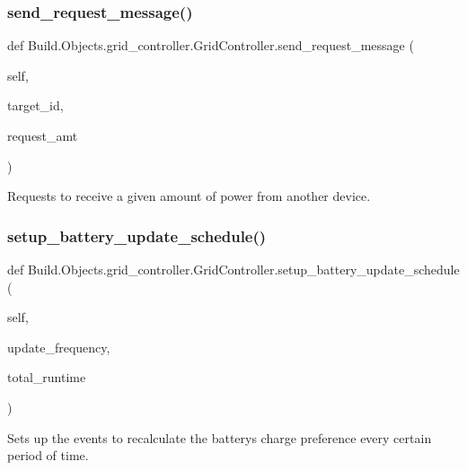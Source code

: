 \subsubsection{\texorpdfstring{send\+\_\+request\+\_\+message()}{send\_request\_message()}}
{\footnotesize\ttfamily def Build.\+Objects.\+grid\+\_\+controller.\+Grid\+Controller.\+send\+\_\+request\+\_\+message (\begin{DoxyParamCaption}\item[{}]{self,  }\item[{}]{target\+\_\+id,  }\item[{}]{request\+\_\+amt }\end{DoxyParamCaption})}



Requests to receive a given amount of power from another device. 

\mbox{\label{class_build_1_1_objects_1_1grid__controller_1_1_grid_controller_a03876bc3ddc4c92dfa5e80e74978169a}} 
\subsubsection{\texorpdfstring{setup\+\_\+battery\+\_\+update\+\_\+schedule()}{setup\_battery\_update\_schedule()}}
{\footnotesize\ttfamily def Build.\+Objects.\+grid\+\_\+controller.\+Grid\+Controller.\+setup\+\_\+battery\+\_\+update\+\_\+schedule (\begin{DoxyParamCaption}\item[{}]{self,  }\item[{}]{update\+\_\+frequency,  }\item[{}]{total\+\_\+runtime }\end{DoxyParamCaption})}



Sets up the events to recalculate the battery\textquotesingle{}s charge preference every certain period of time. 


